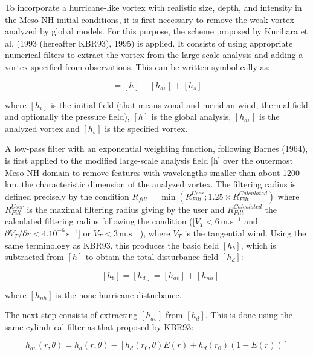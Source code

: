To incorporate a hurricane-like vortex with realistic size, depth, and intensity 
in the Meso-NH initial conditions, it is first necessary to remove the weak 
vortex analyzed by global models. For this purpose, the scheme proposed by 
Kurihara et al. (1993 (hereafter KBR93), 1995) is applied.
It consists of using appropriate numerical  filters to extract the vortex
from the large-scale analysis and adding a vortex specified from observations.
This can be written symbolically as:

\begin{equation}
[h_{i}]=[h]-[h_{av}]+[h_{s}]
\label{hi}
\end{equation}

where $[h_{i}]$ is the initial field (that means zonal and meridian wind, thermal field and optionally the pressure field), $[h]$ is the global analysis, $[h_{av}]$ is 
the analyzed vortex and $[h_{s}]$ is the specified vortex. 

A low-pass filter with an exponential weighting function, following Barnes (1964),
 is first applied to the modified large-scale analysis field [h] over the outermost Meso-NH domain to 
remove features with wavelengths smaller than about 1200 km, the characteristic 
dimension of the analyzed vortex. The filtering radius is defined precisely by the condition $R_{filt}=\min(R_{Filt}^{User}; 1.25\times R_{Filt}^{Calculated})$ where $R_{Filt}^{User}$ is the maximal filtering radius giving by the user and $R_{Filt}^{Calculated}$ the calculated filtering radius following the condition ($[V_{T}<6\,\mbox{m.s}^{-1}$ and $ \partial V_{T} / {\partial r} <4.10^{-6}\,\mbox{s}^{-1}]$ or $V_{T}<3\,\mbox{m.s}^{-1}$), where $V_{T}$ is the tangential wind.
Using the same terminology as KBR93, this 
produces the basic field $[h_{b}]$, which is subtracted from $[h]$ to obtain the 
total disturbance field $[h_{d}]$:

\begin{equation}
[h]-[h_{b}]=[h_{d}]=[h_{av}]+[h_{nh}]
\label{hb}
\end{equation}

where $[h_{nh}]$ is the none-hurricane disturbance.

The next step consists of extracting $[h_{av}]$ from $[h_{d}]$. This is done 
using the same cylindrical filter as that proposed by KBR93:

\begin{equation}
h_{av}(r,\theta)=h_{d}(r,\theta)-[h_{d}(r_{0},\theta)E(r)+h_{d}(r_{0})(1-E(r))]
\end{equation}

